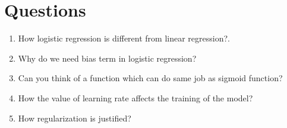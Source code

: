 \documentclass[journal,12pt,onecolumn]{IEEEtran}
\theoremstyle{remark}
\numberwithin{equation}{section}
\begin{document}
		\section{Questions}
		\begin{enumerate}
			\item How logistic regression is different from linear regression?.
			\item Why do we need bias term in logistic regression?
			\item Can you think of a function which can do same job as sigmoid function?
			\item How the value of learning rate affects the training of the model?
			\item How regularization is justified?
		\end{enumerate}
	
\end{document}
